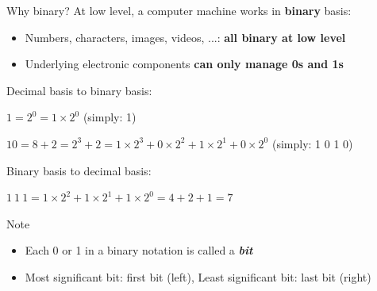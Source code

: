 \documentclass{beamer}[10pt, usepdftitle=false, handout]
\begin{document}
	\begin{frame}

	\begin{block}{Why binary?}
	At low level, a computer machine works in \textbf{binary} basis:
	\begin{itemize}
	\item{Numbers, characters, images, videos, ...: \textbf{all binary at low level}}
	\item{Underlying electronic components \textbf{can only manage 0s and 1s}}
	\end{itemize}		
	\end{block}
		
	Decimal basis to binary basis:
	\vspace*{0.5em}
	
	$1 = 2^0 = 1\times 2^0$ (simply: 1) 
	
	$10 = 8 + 2 = 2^3 + 2 = 1\times 2^3 + 0\times 2^2 + 1\times 2^1 + 0\times 2^0$ (simply: 1 0 1 0) 	
	
	\vspace*{0.5em}
	
	Binary basis to decimal basis:
	\vspace*{0.5em}

	$1\  1\  1 = 1\times 2^2 + 1\times 2^1 + 1\times 2^0 = 4 + 2 + 1 = 7$
	
	\vspace*{0.5em}
	
	\begin{block}{Note}
	\begin{itemize}
	\item{Each 0 or 1 in a binary notation is called a \textbf{\textit{bit}}}
	\item{Most significant bit: first bit (left), Least significant bit: last bit (right)}
	\end{itemize}
	\end{block}

	\end{frame}
	
\end{document}
